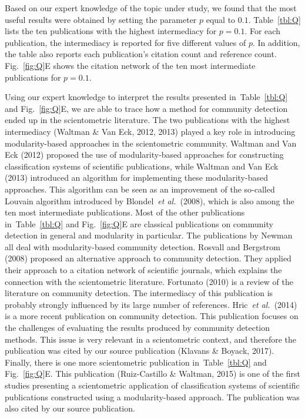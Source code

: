 \documentclass[9pt,twocolumn,twoside]{pnas-alt} %
\theoremstyle{definition}
\newcommand{\subfigref}[2]{Fig.~\ref{fig:#1}#2\xspace}
\newcommand{\tblref}[1]{Table~\ref{tbl:#1}\xspace}
\renewcommand{\etal}{~\emph{et al.}\xspace}
\begin{document}
Based on our expert knowledge of the topic under study, we found that the most useful results were obtained by setting the parameter $p$ equal to $0.1$. \tblref{Q} lists the ten publications with the highest intermediacy for $p = 0.1$. For each publication, the intermediacy is reported for five different values of $p$. In addition, the table also reports each publication’s citation count and reference count. \subfigref{Q}{E} shows the citation network of the ten most intermediate publications for $p = 0.1$.

Using our expert knowledge to interpret the results presented in~\tblref{Q} and \subfigref{Q}{E}, we are able to trace how a method for community detection ended up in the scientometric literature. The two publications with the highest intermediacy (Waltman \& Van Eck, 2012, 2013) played a key role in introducing modularity-based approaches in the scientometric community. Waltman and Van Eck (2012) proposed the use of modularity-based approaches for constructing classification systems of scientific publications, while Waltman and Van Eck (2013) introduced an algorithm for implementing these modularity-based approaches. This algorithm can be seen as an improvement of the so-called Louvain algorithm introduced by Blondel\etal~(2008), which is also among the ten most intermediate publications. Most of the other publications in~\tblref{Q} and \subfigref{Q}{E} are classical publications on community detection in general and modularity in particular. The publications by Newman all deal with modularity-based community detection. Rosvall and Bergstrom (2008) proposed an alternative approach to community detection. They applied their approach to a citation network of scientific journals, which explains the connection with the scientometric literature. Fortunato (2010) is a review of the literature on community detection. The intermediacy of this publication is probably strongly influenced by its large number of references. Hric\etal~(2014) is a more recent publication on community detection. This publication focuses on the challenges of evaluating the results produced by community detection methods. This issue is very relevant in a scientometric context, and therefore the publication was cited by our source publication (Klavans \& Boyack, 2017). Finally, there is one more scientometric publication in~\tblref{Q} and \subfigref{Q}{E}. This publication (Ruiz-Castillo \& Waltman, 2015) is one of the first studies presenting a scientometric application of classification systems of scientific publications constructed using a modularity-based approach. The publication was also cited by our source publication.
\end{document}
